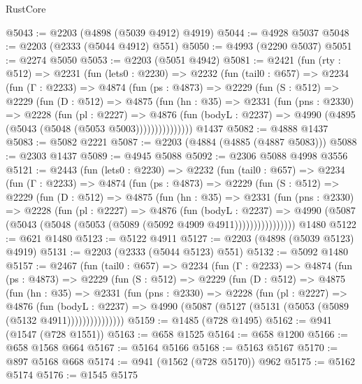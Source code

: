 \begin{lexlean}{RustCore}
\begin{coremodule}
@5043 := @2203 (@4898 (@5039 @4912) @4919)
@5044 := @4928 @5037
@5048 := @2203 (@2333 (@5044 @4912) @551)
@5050 := @4993 (@2290 @5037)
@5051 := @2274 @5050
@5053 := @2203 (@5051 @4942)
@5081 := @2421
    (fun (rty : @512) =>
    @2231
      (fun (lets0 : @2230) =>
      @2232
        (fun (tail0 : @657) =>
        @2234
          (fun (Γ : @2233) =>
          @4874
            (fun (ps : @4873) =>
            @2229
              (fun (S : @512) =>
              @2229
                (fun (D : @512) =>
                @4875
                  (fun (hn : @35) =>
                  @2331
                    (fun (pns : @2330) =>
                    @2228
                      (fun (pl : @2227) =>
                      @4876
                        (fun (bodyL : @2237) =>
                        @4990 (@4895 (@5043 (@5048 (@5053 @5003)))))))))))))))
    @1437
@5082 := @4888 @1437
@5083 := @5082 @2221
@5087 := @2203 (@4884 (@4885 (@4887 @5083)))
@5088 := @2303 @1437
@5089 := @4945 @5088
@5092 := @2306 @5088 @4998 @3556
@5121 := @2443
    (fun (lets0 : @2230) =>
    @2232
      (fun (tail0 : @657) =>
      @2234
        (fun (Γ : @2233) =>
        @4874
          (fun (ps : @4873) =>
          @2229
            (fun (S : @512) =>
            @2229
              (fun (D : @512) =>
              @4875
                (fun (hn : @35) =>
                @2331
                  (fun (pns : @2330) =>
                  @2228
                    (fun (pl : @2227) =>
                    @4876
                      (fun (bodyL : @2237) =>
                      @4990 (@5087 (@5043 (@5048 (@5053 (@5089 (@5092 @4909 @4911))))))))))))))))
    @1480
@5122 := @621 @1480
@5123 := @5122 @4911
@5127 := @2203 (@4898 (@5039 @5123) @4919)
@5131 := @2203 (@2333 (@5044 @5123) @551)
@5132 := @5092 @1480
@5157 := @2467
    (fun (tail0 : @657) =>
    @2234
      (fun (Γ : @2233) =>
      @4874
        (fun (ps : @4873) =>
        @2229
          (fun (S : @512) =>
          @2229
            (fun (D : @512) =>
            @4875
              (fun (hn : @35) =>
              @2331
                (fun (pns : @2330) =>
                @2228
                  (fun (pl : @2227) =>
                  @4876
                    (fun (bodyL : @2237) =>
                    @4990 (@5087 (@5127 (@5131 (@5053 (@5089 (@5132 @4911)))))))))))))))
@5159 := @1485 (@728 @1495)
@5162 := @941 (@1547 (@728 @1551))
@5163 := @658 @1525
@5164 := @658 @1200
@5166 := @658 @1568 @664
@5167 := @5164 @5166
@5168 := @5163 @5167
@5170 := @897 @5168 @668
@5174 := @941 (@1562 (@728 @5170)) @962
@5175 := @5162 @5174
@5176 := @1545 @5175

\end{coremodule}
\end{lexlean}
